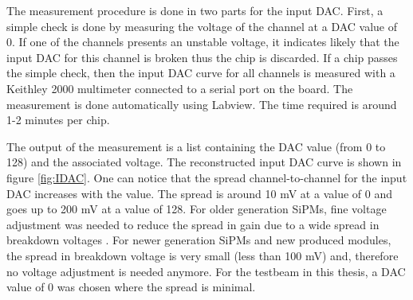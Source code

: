 The measurement procedure is done in two parts for the input DAC. First, a simple check is done by measuring the voltage of the channel at a DAC value of 0. If one of the channels presents an unstable voltage, it indicates likely that the input DAC for this channel is broken thus the chip is discarded. If a chip passes the simple check, then the input DAC curve for all channels is measured with a Keithley 2000 multimeter connected to a serial port on the board. The measurement is done automatically using Labview. The time required is around 1-2 minutes per chip.

The output of the measurement is a list containing the DAC value (from 0 to 128) and the associated voltage. The reconstructed input DAC curve is shown in figure \ref{fig:IDAC}. One can notice that the spread channel-to-channel for the input DAC increases with the value. The spread is around 10 mV at a value of 0 and goes up to 200 mV at a value of 128. For older generation SiPMs, fine voltage adjustment was needed to reduce the spread in gain due to a wide spread in breakdown voltages \cite{Hartbrich2012}. For newer generation SiPMs and new produced modules, the spread in breakdown voltage is very small (less than 100 mV) and, therefore no voltage adjustment is needed anymore. For the testbeam in this thesis, a DAC value of 0 was chosen where the spread is minimal.

